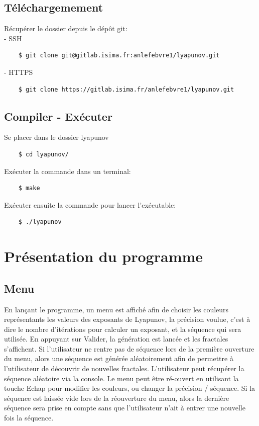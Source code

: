 \documentclass{article}
\begin{document}
	\subsection{Téléchargemement}
	\noindent Récupérer le dossier depuis le dépôt git:\\
	- SSH
	\begin{lstlisting}
	$ git clone git@gitlab.isima.fr:anlefebvre1/lyapunov.git
	\end{lstlisting}
	- HTTPS
	\begin{lstlisting}
	$ git clone https://gitlab.isima.fr/anlefebvre1/lyapunov.git
	\end{lstlisting}
	\subsection{Compiler - Exécuter}
	\noindent Se placer dans le dossier lyapunov
	\begin{lstlisting}
	$ cd lyapunov/
	\end{lstlisting}
	Exécuter la commande dans un terminal:
	\begin{lstlisting}
	$ make
	\end{lstlisting}
	Exécuter ensuite la commande pour lancer l'exécutable:
	\begin{lstlisting}
	$ ./lyapunov
	\end{lstlisting}

	\section{Présentation du programme}
	\subsection{Menu}
	En lançant le programme, un menu est affiché afin de choisir les couleurs représentants les valeurs des exposants de Lyapunov, la précision voulue, c'est à dire le nombre d'itérations pour calculer un exposant, et la séquence qui sera utilisée.
	En appuyant sur Valider, la génération est lancée et les fractales s'affichent.
	Si l'utilisateur ne rentre pas de séquence lors de la première ouverture du menu, alors une séquence est générée aléatoirement afin de permettre à l'utilisateur de découvrir de nouvelles fractales.
	L'utilisateur peut récupérer la séquence aléatoire via la console.
	Le menu peut être ré-ouvert en utilisant la touche Echap pour modifier les couleurs, ou changer la précision / séquence.
	Si la séquence est laissée vide lors de la réouverture du menu, alors la dernière séquence sera prise en compte sans que l'utilisateur n'ait à entrer une nouvelle fois la séquence.
\end{document}
